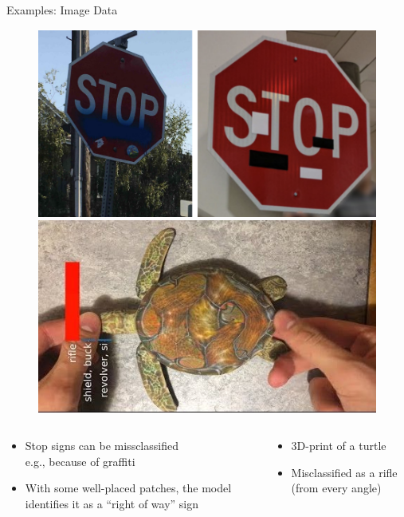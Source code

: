 \documentclass[11pt,compress,t,notes=noshow, aspectratio=169, xcolor=table]{beamer}
\begin{document}
\begin{vbframe}[c]{Examples: Image Data   }
\begin{figure}[h]
\centering
\includegraphics[width=0.46\linewidth]{figure/AEstop.png}\quad \includegraphics[width=0.45\linewidth]{figure/AEturtle.jpg}
  \label{fig:mnist}
\end{figure} 

\begin{columns}

\begin{column}{0.5\textwidth}

\begin{itemize}
    \item Stop signs can be missclassified\\ e.g., because of graffiti
    \item With some well-placed patches, the model identifies it as a ``right of way'' sign
\end{itemize}

\end{column}

\begin{column}{0.5\textwidth}

\begin{itemize}
    \item 3D-print of a turtle
    \item Misclassified as a rifle (from every angle)
\end{itemize}

\end{column}

\end{columns}


\end{vbframe}
\end{document}
